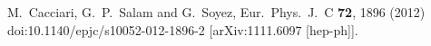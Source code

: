 \documentclass{ws-mpla}
\begin{document}
\begin{thebibliography}{99}
  M.~Cacciari, G.~P.~Salam and G.~Soyez,
  Eur.\ Phys.\ J.\ C {\bf 72}, 1896 (2012)
  doi:10.1140/epjc/s10052-012-1896-2
  [arXiv:1111.6097 [hep-ph]].
\end{thebibliography}
\end{document}
